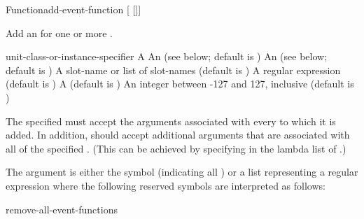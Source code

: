 \documentclass[10pt,twoside,english,pdftex]{article}
\begin{document}
\begin{functiondoc}{Function}{add-event-function}%
{ [ 
[]] \\
 }
%


\fnsyntax

\fnpurpose Add an  for one or more .

\fnpackage {}

\fnmodule {}

\fnargs
\begin{args}{unit-class-or-instance-specifier}
\arg[function] A 
 An  
(see below; default is )
 An 
(see below; default is )
 A slot-name or list
of slot-names (default is )
 A 
regular expression 
(default is \code{(*)})
\arg[permanent] A  (default is \nil)
\arg[priority] An integer between -127 and 127, inclusive (default is )
\end{args}

\fndsyntax
\eventclassspec
\subeventingspec
\syntaxsep
\unitclassinstancespec
\subclassingspec

\fndescription 
The specified  must accept the arguments associated with every
 to which it is added.  In addition, 
should accept additional arguments that are associated with all
 of the specified . (This can be
achieved by specifying  in the lambda list of
.)

The  argument is either the symbol  (indicating
all ) or a list representing a regular
expression where the following reserved symbols are interpreted as
follows:
\spaceinstanceregexp

\begin{alsos}{remove-all-event-functions}
\end{alsos}


\end{functiondoc}
\end{document}
